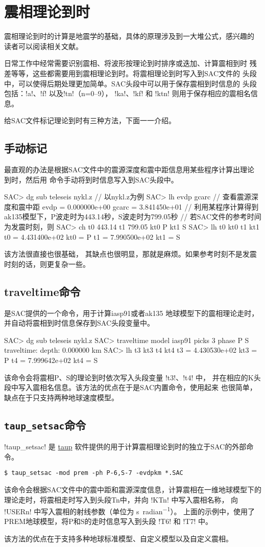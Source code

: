 \section{震相理论到时}
震相理论到时的计算是地震学的基础，具体的原理涉及到一大堆公式，感兴趣的
读者可以阅读相关文献。

日常工作中经常需要识别震相、将波形按理论到时排序或迭加、计算震相到时
残差等等，这些都需要用到震相理论到时。将震相理论到时写入到SAC文件的
头段中，可以使得后期处理更加简单。SAC头段中可以用于保存震相到时信息的
头段包括：!a!、!f! 以及!tn!（n=0--9），
!ka!、!kf! 和 !ktn! 则用于保存相应的震相名信息。

给SAC文件标记理论到时有三种方法，下面一一介绍。

\subsection{手动标记}
最直观的办法是根据SAC文件中的震源深度和震中距信息用某些程序计算出理论
到时，然后用  命令手动将到时信息写入到SAC头段中。
\begin{SACCode}
SAC> dg sub teleseis nykl.z     // 以nykl.z为例
SAC> lh evdp gcarc              // 查看震源深度和震中距
     evdp = 0.000000e+00
    gcarc = 3.841450e+01
// 利用某程序计算得到ak135模型下，P波走时为443.14秒，S波走时为799.05秒
// 若SAC文件的参考时间为发震时刻，则
SAC> ch t0 443.14 t1 799.05 kt0 P kt1 S
SAC> lh t0 kt0 t1 kt1
     t0 = 4.431400e+02
    kt0 = P
     t1 = 7.990500e+02
    kt1 = S
\end{SACCode}
该方法很直接也很基础， 其缺点也很明显，那就是麻烦。如果参考时刻不是发震
时刻的话，则更复杂一些。

\subsection{traveltime命令}
 是SAC提供的一个命令，用于计算iasp91或者ak135
地球模型下的震相理论走时，并自动将震相到时信息保存到SAC头段变量中。
\begin{SACCode}
SAC> dg sub teleseis nykl.z
SAC> traveltime model iasp91 picks 3 phase P S
traveltime: depth: 0.000000 km
SAC> lh t3 kt3 t4 kt4
         t3 = 4.430530e+02
        kt3 = P
         t4 = 7.999642e+02
        kt4 = S
\end{SACCode}
该命令会将震相P、S的理论到时依次写入头段变量 !t3!、!t4! 中，
并在相应的K头段中写入震相名信息。该方法的优点在于是SAC内置命令，使用起来
也很简单，缺点在于只支持两种地球速度模型。

\subsection{\texttt{taup\_setsac}命令}
!taup_setsac! 是 \href{http://www.seis.sc.edu/taup/}{taup}
软件提供的用于计算震相理论到时的独立于SAC的外部命令。
\begin{verbatim}
$ taup_setsac -mod prem -ph P-6,S-7 -evdpkm *.SAC
\end{verbatim}
该命令会根据SAC文件中的震中距和震源深度信息，计算震相在一维地球模型下的
理论走时，将震相走时写入到头段Tn中，并向 !KTn! 中写入震相名称，
向 !USERn! 中写入震相的射线参数（单位为 \si{\s\per radian}）。
上面的示例中，使用了PREM地球模型，将P和S的走时信息写入到头段 !T6!
和 !T7! 中。

该方法的优点在于支持多种地球标准模型、自定义模型以及自定义震相。
